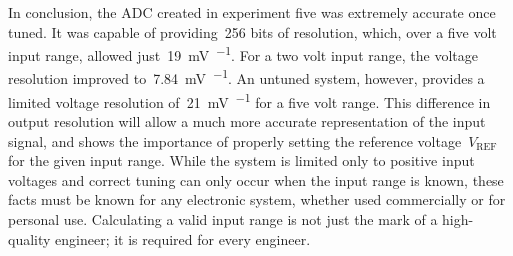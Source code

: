 In conclusion, the ADC created in experiment five was extremely accurate once tuned.  It was capable of providing~256 bits of resolution, which, over a five volt input range, allowed just~\SI{19}{\milli\volt\per\bit}.  For a two volt input range, the voltage resolution improved to~\SI{7.84}{\milli\volt\per\bit}.  An untuned system, however, provides a limited voltage resolution of~\SI{21}{\milli\volt\per\bit} for a five volt range.  This difference in output resolution will allow a much more accurate representation of the input signal, and shows the importance of properly setting the reference voltage~$V_\text{REF}$ for the given input range.  While the system is limited only to positive input voltages and correct tuning can only occur when the input range is known, these facts must be known for any electronic system, whether used commercially or for personal use.  Calculating a valid input range is not just the mark of a high-quality engineer; it is required for every engineer.
